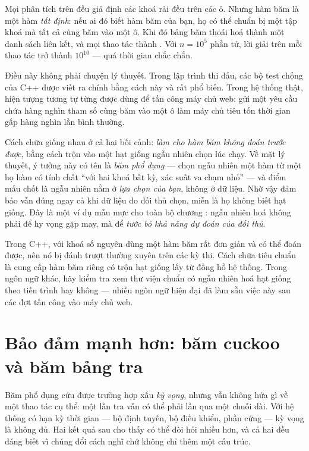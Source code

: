 \documentclass[../../algorithm.tex]{subfiles}
\begin{document}
Mọi phân tích trên đều giả định các khoá rải đều trên các ô. Nhưng hàm băm là một hàm \emph{tất định}: nếu ai đó biết hàm băm của bạn, họ có thể chuẩn bị một tập khoá mà tất cả cùng băm vào một ô. Khi đó bảng băm thoái hoá thành một danh sách liên kết, và mọi thao tác thành . Với \(n = 10^5\) phần tử, lời giải  trên mỗi thao tác trở thành \(10^{10}\) --- quá thời gian chắc chắn.

Điều này không phải chuyện lý thuyết. Trong lập trình thi đấu, các bộ test chống  của C++ được viết ra chính bằng cách này và rất phổ biến. Trong hệ thống thật, hiện tượng tương tự từng được dùng để tấn công máy chủ web: gửi một yêu cầu chứa hàng nghìn tham số cùng băm vào một ô làm máy chủ tiêu tốn thời gian gấp hàng nghìn lần bình thường.

Cách chữa giống nhau ở cả hai bối cảnh: \emph{làm cho hàm băm không đoán trước được}, bằng cách trộn vào một hạt giống ngẫu nhiên chọn lúc chạy. Về mặt lý thuyết, ý tưởng này có tên là \emph{băm phổ dụng} --- chọn ngẫu nhiên một hàm từ một họ hàm có tính chất ``với hai khoá bất kỳ, xác suất va chạm nhỏ'' --- và điểm mấu chốt là ngẫu nhiên nằm ở \emph{lựa chọn của bạn}, không ở dữ liệu. Nhờ vậy đảm bảo vẫn đúng ngay cả khi dữ liệu do đối thủ chọn, miễn là họ không biết hạt giống. Đây là một ví dụ mẫu mực cho toàn bộ chương : ngẫu nhiên hoá không phải để hy vọng gặp may, mà để \emph{tước bỏ khả năng dự đoán của đối thủ}.

\begin{cambay}
Trong C++,  với khoá số nguyên dùng một hàm băm rất đơn giản và có thể đoán được, nên nó bị đánh trượt thường xuyên trên các kỳ thi. Cách chữa tiêu chuẩn là cung cấp hàm băm riêng có trộn hạt giống lấy từ đồng hồ hệ thống. Trong ngôn ngữ khác, hãy kiểm tra xem thư viện chuẩn có ngẫu nhiên hoá hạt giống theo tiến trình hay không --- nhiều ngôn ngữ hiện đại đã làm sẵn việc này sau các đợt tấn công vào máy chủ web.
\end{cambay}

\section{Bảo đảm mạnh hơn: băm cuckoo và băm bảng tra}

Băm phổ dụng cứu được trường hợp xấu \emph{kỳ vọng}, nhưng vẫn không hứa gì về một thao tác cụ thể: một lần tra vẫn có thể phải lần qua một chuỗi dài. Với hệ thống có hạn kỳ thời gian --- bộ định tuyến, bộ điều khiển, phần cứng --- kỳ vọng là không đủ. Hai kết quả sau cho thấy có thể đòi hỏi nhiều hơn, và cả hai đều đáng biết vì chúng đổi cách nghĩ chứ không chỉ thêm một cấu trúc.
\end{document}
